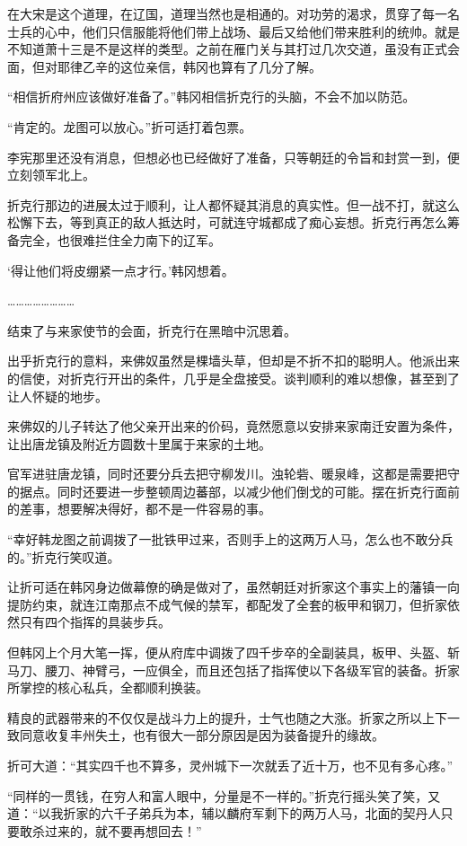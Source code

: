 在大宋是这个道理，在辽国，道理当然也是相通的。对功劳的渴求，贯穿了每一名士兵的心中，他们只信服能将他们带上战场、最后又给他们带来胜利的统帅。就是不知道萧十三是不是这样的类型。之前在雁门关与其打过几次交道，虽没有正式会面，但对耶律乙辛的这位亲信，韩冈也算有了几分了解。

“相信折府州应该做好准备了。”韩冈相信折克行的头脑，不会不加以防范。

“肯定的。龙图可以放心。”折可适打着包票。

李宪那里还没有消息，但想必也已经做好了准备，只等朝廷的令旨和封赏一到，便立刻领军北上。

折克行那边的进展太过于顺利，让人都怀疑其消息的真实性。但一战不打，就这么松懈下去，等到真正的敌人抵达时，可就连守城都成了痴心妄想。折克行再怎么筹备完全，也很难拦住全力南下的辽军。

‘得让他们将皮绷紧一点才行。’韩冈想着。

……………………

结束了与来家使节的会面，折克行在黑暗中沉思着。

出乎折克行的意料，来佛奴虽然是棵墙头草，但却是不折不扣的聪明人。他派出来的信使，对折克行开出的条件，几乎是全盘接受。谈判顺利的难以想像，甚至到了让人怀疑的地步。

来佛奴的儿子转达了他父亲开出来的价码，竟然愿意以安排来家南迁安置为条件，让出唐龙镇及附近方圆数十里属于来家的土地。

官军进驻唐龙镇，同时还要分兵去把守柳发川。浊轮砦、暖泉峰，这都是需要把守的据点。同时还要进一步整顿周边蕃部，以减少他们倒戈的可能。摆在折克行面前的差事，想要解决得好，都不是一件容易的事。

“幸好韩龙图之前调拨了一批铁甲过来，否则手上的这两万人马，怎么也不敢分兵的。”折克行笑叹道。

让折可适在韩冈身边做幕僚的确是做对了，虽然朝廷对折家这个事实上的藩镇一向提防约束，就连江南那点不成气候的禁军，都配发了全套的板甲和钢刀，但折家依然只有四个指挥的具装步兵。

但韩冈上个月大笔一挥，便从府库中调拨了四千步卒的全副装具，板甲、头盔、斩马刀、腰刀、神臂弓，一应俱全，而且还包括了指挥使以下各级军官的装备。折家所掌控的核心私兵，全都顺利换装。

精良的武器带来的不仅仅是战斗力上的提升，士气也随之大涨。折家之所以上下一致同意收复丰州失土，也有很大一部分原因是因为装备提升的缘故。

折可大道：“其实四千也不算多，灵州城下一次就丢了近十万，也不见有多心疼。”

“同样的一贯钱，在穷人和富人眼中，分量是不一样的。”折克行摇头笑了笑，又道：“以我折家的六千子弟兵为本，辅以麟府军剩下的两万人马，北面的契丹人只要敢杀过来的，就不要再想回去！”


